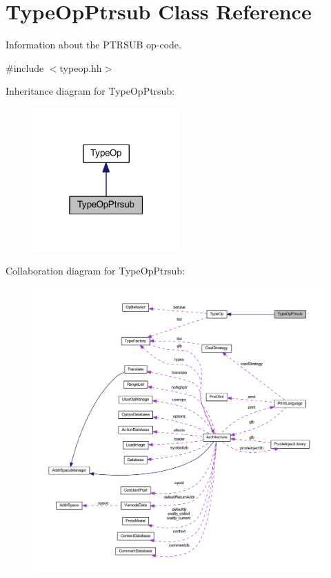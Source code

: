\hypertarget{class_type_op_ptrsub}{}\section{Type\+Op\+Ptrsub Class Reference}
\label{class_type_op_ptrsub}


Information about the P\+T\+R\+S\+UB op-\/code.  




{\ttfamily \#include $<$typeop.\+hh$>$}



Inheritance diagram for Type\+Op\+Ptrsub\+:
\nopagebreak
\begin{figure}[H]
\begin{center}
\leavevmode
\includegraphics[width=159pt]{class_type_op_ptrsub__inherit__graph}
\end{center}
\end{figure}


Collaboration diagram for Type\+Op\+Ptrsub\+:
\nopagebreak
\begin{figure}[H]
\begin{center}
\leavevmode
\includegraphics[width=350pt]{class_type_op_ptrsub__coll__graph}
\end{center}
\end{figure}
